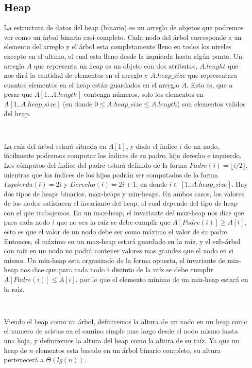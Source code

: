 \subsection{Heap}

La estructura de datos del heap (binario) es un arreglo de objetos que podremos ver como un \'arbol binario casi-completo. Cada nodo del \'arbol corresponde a un elemento del arreglo y el \'arbol esta completamente lleno en todos los niveles excepto en el ultimo, el cual esta lleno desde la izquierda hasta alg\'un punto. Un arreglo $A$ que representa un heap es un objeto con dos atributos, $A.lenght$ que nos dir\'a la cantidad de elementos en el arreglo y $A.heap\_size$ que representara cuantos elementos en el heap est\'an guardados en el arreglo $A$. Esto es, que a pesar que $A[1..A.length]$ contenga n\'umeros, solo los elementos en $A[1..A.heap\_size]$ (en donde $0 \leq A.heap\_size \leq A.length$) son elementos validos del heap.

~

La ra\'iz del \'arbol estar\'a situada en $A[1]$, y dado el \'indice $i$ de un nodo, f\'acilmente podremos computar los \'indices de su padre, hijo derecho e izquierdo. Los c\'omputos del \'indice del padre estar\'a definido de la forma $Padre(i) = \lfloor i/2 \rfloor$, mientras que los \'indices de los hijos podr\'an ser computados de la forma $Izquierda(i) = 2i$ y $Derecha(i) = 2i+1$, en donde $i \in [1..A.heap\_size]$. Hay dos tipos de heaps binarios, max-heaps y min-heaps. En ambos casos, los valores de los nodos satisfacen el invariante del heap, el cual depende del tipo de heap con el que trabajemos. En un max-heap, el invariante del max-heap nos dice que para cada nodo $i$ que no sea la ra\'iz se debe cumplir que $A[Padre(i)] \geq A[i]$, esto es que el valor de un nodo debe ser como m\'aximo el valor de su padre. Entonces, el m\'aximo en un max-heap estar\'a guardado en la ra\'iz, y el sub-\'arbol con ra\'iz en un nodo no podr\'a contener valores mas grandes que el nodo en si mismo. Un min-heap esta 
organizado de la forma opuesta, el invariante de min-heap nos dice que para cada nodo $i$ distinto de la ra\'iz se debe cumplir $A[Padre(i)] \leq A[i]$, por lo que el elemento m\'inimo de un min-heap estar\'a en la ra\'iz.

~

Viendo el heap como un \'arbol, definiremos la altura de un nodo en un heap como el numero de aristas en el camino simple mas largo desde el nodo mismo hasta una hoja, y definiremos la altura del heap como la altura de su ra\'iz. Ya que un heap de $n$ elementos esta basado en un \'arbol binario completo, su altura pertenecer\'a a $\Theta(lg(n))$.

